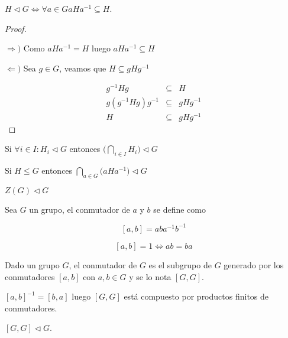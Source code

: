 \begin{prop}
$H \triangleleft G \Leftrightarrow \forall a \in G aHa^{-1} \subseteq H$.
\end{prop}

\begin{proof} $ $

$\Rightarrow )$ Como $aHa^{-1} = H$ luego $aHa^{-1} \subseteq H$

$\Leftarrow )$ Sea $g \in G$, veamos que $H \subseteq gHg^{-1}$

\begin{eqnarray*}
g^{-1}Hg &\subseteq& H\\
g(g^{-1}Hg)g^{-1} &\subseteq& gHg^{-1}\\
H &\subseteq& gHg^{-1}
\end{eqnarray*}
\end{proof}

\begin{obs}
Si $\forall i \in I: H_i \triangleleft G$ entonces $\displaystyle \big( \bigcap_{i \in I} H_i \big) \triangleleft G$
\end{obs}

\begin{obs}
Si $H \leq G$ entonces $\displaystyle \bigcap_{a \in G} \big(aHa^{-1}\big) \triangleleft G$
\end{obs}

\begin{obs}
$Z(G) \triangleleft G$
\end{obs}

\begin{defn}
Sea $G$ un grupo, el conmutador de $a$ y $b$ se define como

$$[a,b] = aba^{-1}b^{-1}$$
\end{defn}

\begin{obs}
$$[a,b] = 1 \Leftrightarrow ab = ba$$
\end{obs}

\begin{defn}
Dado un grupo $G$, el conmutador de $G$ es el subgrupo de $G$ generado por los conmutadores $[a,b]$ con $a,b \in G$ y se lo nota $[G,G]$.
\end{defn}

\begin{obs}
$[a,b]^{-1} = [b,a]$ luego $[G,G]$ est\'a compuesto por productos finitos de conmutadores.
\end{obs}

\begin{prop}
$[G,G] \triangleleft G$.
\end{prop}

